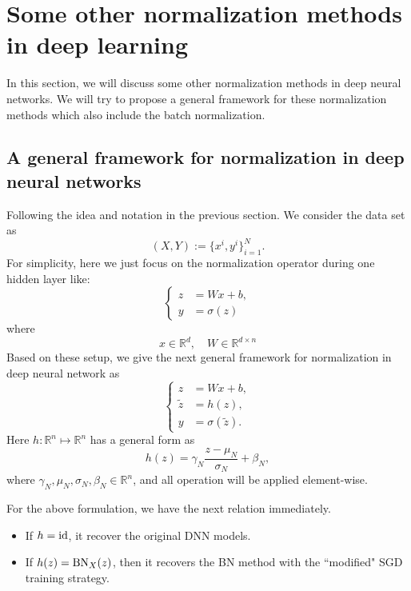 



\section{Some other normalization methods in deep learning}
In this section, we will discuss some other normalization methods in deep neural networks.
We will try to propose a general framework for  these normalization methods which also include the batch normalization.

\subsection{A general framework for normalization in deep neural networks}
Following the idea and notation in the previous section. We consider the data set as
\begin{equation}\label{eq:trainingdata1}
(X,Y) := \{x^i, y^i\}_{i=1}^N.
\end{equation}
For simplicity, here we just focus on the normalization operator during one hidden layer like:
\begin{equation}
\begin{cases}
z &= Wx + b,\\
y &= \sigma(z) 
\end{cases}
\end{equation}
where 
\begin{equation}
x \in \mathbb{R}^d, \quad W \in \mathbb{R}^{d\times n}
\end{equation}
Based on these setup, we give the next general framework for normalization in deep neural network as
\begin{equation}\label{eq:norm-h}
\begin{cases}
z &= Wx + b,\\
\tilde  z &= h(z),\\
y &= \sigma(\tilde z).
\end{cases}
\end{equation}
Here $h: \mathbb{R}^{n} \mapsto \mathbb{R}^n$ has a general form as
$$
h(z) = \gamma_N \frac{z - \mu_N}{\sigma_N} + \beta_N,
$$
where $\gamma_N, \mu_N, \sigma_N, \beta_N \in \mathbb{R}^n$, and all operation will be applied element-wise.

For the above formulation, we have the next relation immediately.
\begin{itemize}
	\item If $h = {\rm id}$, it recover the original DNN models.
	\item If $h(z) = {\rm BN}_{X}(z)$, then it recovers the BN method with the ``modified" SGD training strategy.
\end{itemize}


